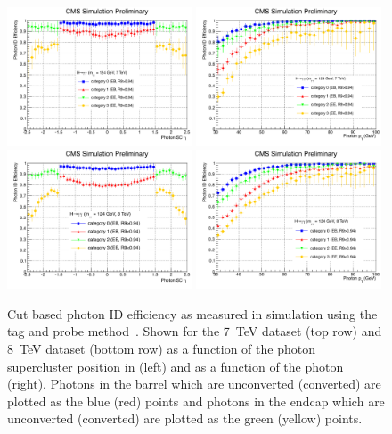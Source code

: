 \begin{figure}
  \includegraphics[width=0.49\textwidth]{selec_and_cats/plots/eff_7TeV_eta_fix.pdf}
  \includegraphics[width=0.49\textwidth]{selec_and_cats/plots/eff_7TeV_pt_fix.pdf}
  \includegraphics[width=0.49\textwidth]{selec_and_cats/plots/eff_8TeV_eta_fix.pdf}
  \includegraphics[width=0.49\textwidth]{selec_and_cats/plots/eff_8TeV_pt_fix.pdf}
  \caption[Cut based photon ID efficiency as measured in \Zee \acs{MC} simulation]{Cut based photon ID efficiency as measured in \Zee \MC simulation using the tag and probe method~\cite{tag_and_probe}. Shown for the 7~TeV dataset (top row) and 8~TeV dataset (bottom row) as a function of the photon supercluster position in \eta (left) and as a function of the photon \pT (right). Photons in the barrel which are unconverted (converted) are plotted as the blue (red) points and photons in the endcap which are unconverted (converted) are plotted as the green (yellow) points.}
  \label{fig:cic_efficiency}
\end{figure}

